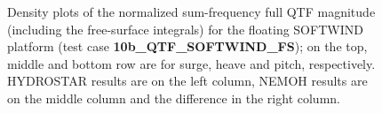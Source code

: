 \documentclass[12pt,a4paper,titlepage]{article}
\begin{document}
\begin{itemize}
\begin{figure}[h!tbp]
	\centering
{}
	\caption{Density plots of the normalized sum-frequency full QTF magnitude (including the free-surface integrals) for the floating SOFTWIND platform (test case \textbf{10b\_QTF\_SOFTWIND\_FS}); on the top, middle and bottom row are for surge, heave and pitch, respectively. HYDROSTAR results are on the left column, NEMOH results are on the middle column and the difference in the right column.}\label{fig:QTFP_SOFTWIND}
\end{figure}


\end{itemize}
\end{document}
